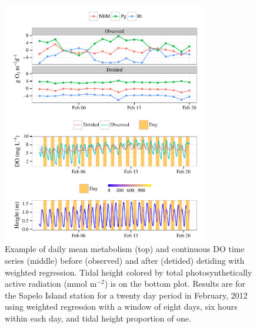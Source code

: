 \documentclass[letterpaper,12pt,oneside]{article}\usepackage[]{graphicx}\usepackage[]{color}
\newenvironment{knitrout}{}{} %
\begin{document}
\centering\vspace*{\fill}
\begin{knitrout}
\color{fgcolor}\begin{figure}[!ht]


{\centering \includegraphics[width=0.8\textwidth]{figure/case_ex2} 

}

\caption[Example of daily mean metabolism (top) and continuous \ac{DO} time series (middle) before (observed) and after (detided) detiding with weighted regression]{Example of daily mean metabolism (top) and continuous \ac{DO} time series (middle) before (observed) and after (detided) detiding with weighted regression. Tidal height colored by total photosynthetically active radiation (mmol m$^{-2}$) is on the bottom plot. Results are for the Sapelo Island station for a twenty day period in February, 2012 using weighted regression with a window of eight days, six hours within each day, and tidal height proportion of one.\label{fig:case_ex2}}
\end{figure}


\end{knitrout}
\end{document}
